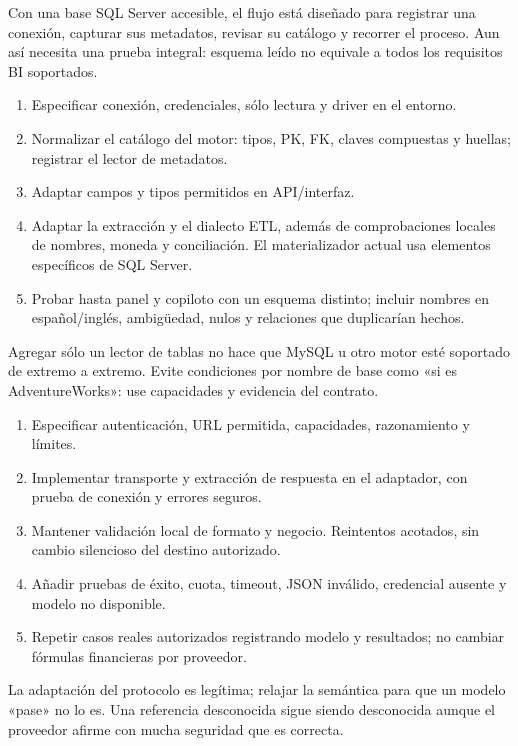 Con una base SQL Server accesible, el flujo está diseñado para registrar una conexión, capturar sus metadatos, revisar su catálogo y recorrer el proceso. Aun así necesita una prueba integral: esquema leído no equivale a todos los requisitos BI soportados.
\begin{enumerate}
\item Especificar conexión, credenciales, sólo lectura y driver en el entorno.
\item Normalizar el catálogo del motor: tipos, PK, FK, claves compuestas y huellas; registrar el lector de metadatos.
\item Adaptar campos y tipos permitidos en API/interfaz.
\item Adaptar la extracción y el dialecto ETL, además de comprobaciones locales de nombres, moneda y conciliación. El materializador actual usa elementos específicos de SQL Server.
\item Probar hasta panel y copiloto con un esquema distinto; incluir nombres en español/inglés, ambigüedad, nulos y relaciones que duplicarían hechos.
\end{enumerate}
Agregar sólo un lector de tablas no hace que MySQL u otro motor esté soportado de extremo a extremo. Evite condiciones por nombre de base como «si es AdventureWorks»: use capacidades y evidencia del contrato.
\begin{enumerate}
\item Especificar autenticación, URL permitida, capacidades, razonamiento y límites.
\item Implementar transporte y extracción de respuesta en el adaptador, con prueba de conexión y errores seguros.
\item Mantener validación local de formato y negocio. Reintentos acotados, sin cambio silencioso del destino autorizado.
\item Añadir pruebas de éxito, cuota, timeout, JSON inválido, credencial ausente y modelo no disponible.
\item Repetir casos reales autorizados registrando modelo y resultados; no cambiar fórmulas financieras por proveedor.
\end{enumerate}
\begin{note}
La adaptación del protocolo es legítima; relajar la semántica para que un modelo «pase» no lo es. Una referencia desconocida sigue siendo desconocida aunque el proveedor afirme con mucha seguridad que es correcta.
\end{note}

